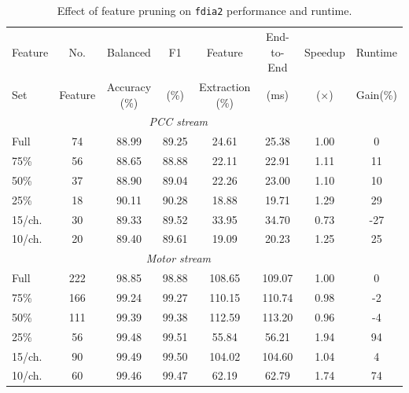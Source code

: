 \documentclass[lettersize,journal]{IEEEtran}
\begin{document}
\begin{table}[t]
\centering
\scriptsize
\caption{Effect of feature pruning on \texttt{fdia2} performance and runtime.}
\label{tab:feature_pruning_anomaly2_runtime}
\renewcommand{\arraystretch}{1.05}
\setlength{\tabcolsep}{2.5pt}
\begin{tabular}{l c c c c c c c}
\hline
Feature & No. & Balanced & F1 & Feature & End-to-End & Speedup & Runtime \\
Set & Feature & Accuracy (\%) & (\%) & Extraction (\%) & (ms) & ($\times$) & Gain(\%) \\
\hline
\multicolumn{7}{c}{\textit{PCC stream}} \\
\hline
Full   & 74  & 88.99 & 89.25 & 24.61 & 25.38  & 1.00 & 0 \\
75\%   & 56  & 88.65 & 88.88 & 22.11 & 22.91 & 1.11 & 11 \\
50\%   & 37  & 88.90 & 89.04 & 22.26 & 23.00 & 1.10 & 10 \\
25\%   & 18  & 90.11 & 90.28 & 18.88 & 19.71 & 1.29 & 29 \\
15/ch. & 30  & 89.33 & 89.52 & 33.95 & 34.70 & 0.73 & -27 \\
10/ch. & 20  & 89.40 & 89.61 & 19.09 & 20.23 & 1.25 & 25 \\
\hline
\multicolumn{7}{c}{\textit{Motor stream}} \\
\hline
Full   & 222 & 98.85 & 98.88 & 108.65 & 109.07 & 1.00 & 0 \\
75\%   & 166 & 99.24 & 99.27 & 110.15 & 110.74 & 0.98 & -2 \\
50\%   & 111 & 99.39 & 99.38 & 112.59 & 113.20 & 0.96 & -4 \\
25\%   & 56  & 99.48 & 99.51 & 55.84 & 56.21  & 1.94 & 94 \\
15/ch. & 90  & 99.49 & 99.50 & 104.02 & 104.60 & 1.04 & 4 \\
10/ch. & 60  & 99.46 & 99.47 & 62.19 & 62.79  & 1.74 & 74 \\
\hline
\end{tabular}
\end{table}
\end{document}
